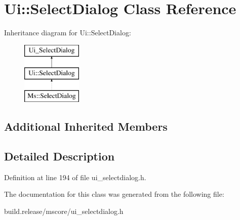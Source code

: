 \hypertarget{class_ui_1_1_select_dialog}{}\section{Ui\+:\+:Select\+Dialog Class Reference}
\label{class_ui_1_1_select_dialog}
Inheritance diagram for Ui\+:\+:Select\+Dialog\+:\begin{figure}[H]
\begin{center}
\leavevmode
\includegraphics[height=3.000000cm]{class_ui_1_1_select_dialog}
\end{center}
\end{figure}
\subsection*{Additional Inherited Members}


\subsection{Detailed Description}


Definition at line 194 of file ui\+\_\+selectdialog.\+h.



The documentation for this class was generated from the following file\+:\begin{DoxyCompactItemize}
\item 
build.\+release/mscore/ui\+\_\+selectdialog.\+h\end{DoxyCompactItemize}
